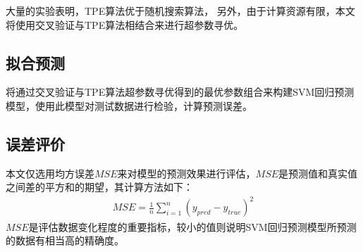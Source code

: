 大量的实验表明，TPE算法优于随机搜索算法\cite{bergstra2011algorithms}，
另外，由于计算资源有限，本文将使用交叉验证与TPE算法相结合来进行超参数寻优。

\subsection{拟合预测}

将通过交叉验证与TPE算法超参数寻优得到的最优参数组合来构建SVM回归预测模型，使用此模型对测试数据进行检验，计算预测误差。

\subsection{误差评价}

本文仅选用均方误差$MSE$来对模型的预测效果进行评估，$MSE$是预测值和真实值之间差的平方和的期望，其计算方法如下：
\begin{align}
    MSE=\frac{1}{n}\sum_{i=1}^n(y_{pred}-y_{true})^2
\end{align}
$MSE$是评估数据变化程度的重要指标，较小的值则说明SVM回归预测模型所预测的数据有相当高的精确度。